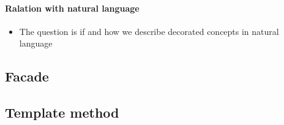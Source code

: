         \paragraph{Ralation with natural language}
            \begin{itemize}
                \item The question is if and how we describe decorated concepts in natural language
            \end{itemize}
            
        
    
    \subsection{Facade}
    
    \subsection{Template method}
    
